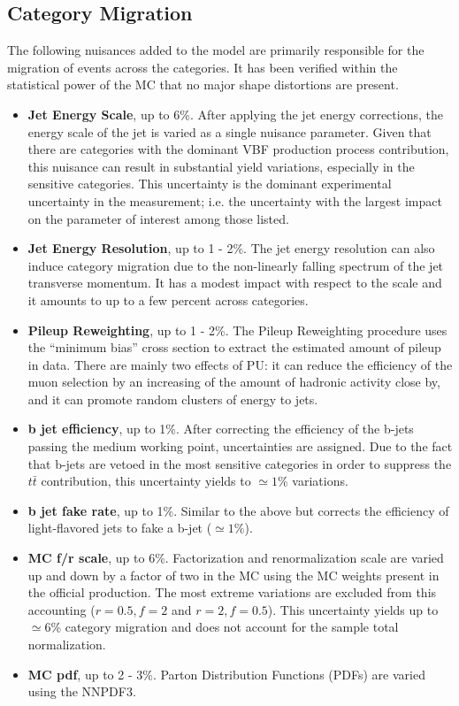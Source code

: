 \subsection{Category Migration}
The following nuisances added to the model are primarily responsible for the migration of events across the categories. It has been verified within the statistical power of the MC that no major shape distortions are present.
\begin{itemize}
    \item {\bf Jet Energy Scale}, up to 6\%. After applying the jet energy corrections, the energy scale of the jet is varied as a single nuisance parameter.
    Given that there are categories with the dominant VBF production process contribution, this nuisance can result in substantial yield variations, especially in the sensitive categories. This uncertainty is the dominant experimental uncertainty in the measurement; i.e. the uncertainty with the largest impact on the parameter of interest among those listed.
    \item {\bf Jet Energy Resolution}, up to 1 - 2\%. The jet energy resolution can also induce category migration due to the non-linearly falling spectrum of the jet transverse momentum. It has a modest impact with respect to the scale and it amounts to up to a few percent across categories.
    \item {\bf Pileup Reweighting}, up to 1 - 2\%. The Pileup Reweighting procedure uses the ``minimum bias'' cross section to extract the estimated amount of pileup in data. There are mainly two effects of PU: it can reduce the efficiency of the muon selection by an increasing of the amount of hadronic activity close by, and it can promote random clusters of energy to jets.
    \item {\bf b jet efficiency}, up to 1\%. After correcting the efficiency of the b-jets passing the medium working point, uncertainties are assigned. Due to the fact that b-jets are vetoed in the most sensitive categories in order to suppress the {$t\bar{t}$} contribution, this uncertainty yields to $\simeq 1\%$ variations.
    \item {\bf b jet fake rate}, up to 1\%. Similar to the above but corrects the efficiency of light-flavored jets to fake a b-jet ($\simeq 1 \%$).
    \item {\bf MC f/r scale}, up to 6\%. Factorization and renormalization scale are varied up and down by a factor of two in the MC using the MC weights present in the official production. The most extreme variations are excluded from this accounting ($r=0.5,f=2$ and $r=2,f=0.5$). This uncertainty yields up to $\simeq 6$\% category migration and does not account for the sample total normalization.
    \item {\bf MC pdf}, up to 2 - 3\%. Parton Distribution Functions (PDFs) are varied using the NNPDF3.
\end{itemize}

